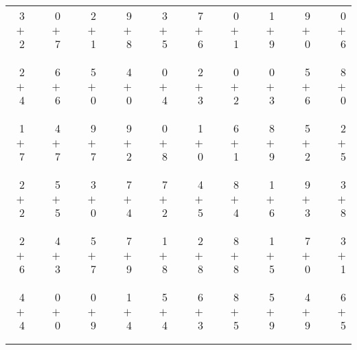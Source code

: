 \documentclass[12pt, letterpaper]{article}
\begin{document}
\begin{tabular}{rrrrrrrrrrrrrrrrrrr}
3 & & 0 & & 2 & & 9 & & 3 & & 7 & & 0 & & 1 & & 9 & & 0\\
$+$ 2 & & $+$ 7 & & $+$ 1 & & $+$ 8 & & $+$ 5 & & $+$ 6 & & $+$ 1 & & $+$ 9 & & $+$ 0 & & $+$ 6\\
\cline{1-1} \cline{3-3} \cline{5-5} \cline{7-7} \cline{9-9} \cline{11-11} \cline{13-13} \cline{15-15} \cline{17-17} \cline{19-19} \\ \\
2 & & 6 & & 5 & & 4 & & 0 & & 2 & & 0 & & 0 & & 5 & & 8\\
$+$ 4 & & $+$ 6 & & $+$ 0 & & $+$ 0 & & $+$ 4 & & $+$ 3 & & $+$ 2 & & $+$ 3 & & $+$ 6 & & $+$ 0\\
\cline{1-1} \cline{3-3} \cline{5-5} \cline{7-7} \cline{9-9} \cline{11-11} \cline{13-13} \cline{15-15} \cline{17-17} \cline{19-19} \\ \\
1 & & 4 & & 9 & & 9 & & 0 & & 1 & & 6 & & 8 & & 5 & & 2\\
$+$ 7 & & $+$ 7 & & $+$ 7 & & $+$ 2 & & $+$ 8 & & $+$ 0 & & $+$ 1 & & $+$ 9 & & $+$ 2 & & $+$ 5\\
\cline{1-1} \cline{3-3} \cline{5-5} \cline{7-7} \cline{9-9} \cline{11-11} \cline{13-13} \cline{15-15} \cline{17-17} \cline{19-19} \\ \\
2 & & 5 & & 3 & & 7 & & 7 & & 4 & & 8 & & 1 & & 9 & & 3\\
$+$ 2 & & $+$ 5 & & $+$ 0 & & $+$ 4 & & $+$ 2 & & $+$ 5 & & $+$ 4 & & $+$ 6 & & $+$ 3 & & $+$ 8\\
\cline{1-1} \cline{3-3} \cline{5-5} \cline{7-7} \cline{9-9} \cline{11-11} \cline{13-13} \cline{15-15} \cline{17-17} \cline{19-19} \\ \\
2 & & 4 & & 5 & & 7 & & 1 & & 2 & & 8 & & 1 & & 7 & & 3\\
$+$ 6 & & $+$ 3 & & $+$ 7 & & $+$ 9 & & $+$ 8 & & $+$ 8 & & $+$ 8 & & $+$ 5 & & $+$ 0 & & $+$ 1\\
\cline{1-1} \cline{3-3} \cline{5-5} \cline{7-7} \cline{9-9} \cline{11-11} \cline{13-13} \cline{15-15} \cline{17-17} \cline{19-19} \\ \\
4 & & 0 & & 0 & & 1 & & 5 & & 6 & & 8 & & 5 & & 4 & & 6\\
$+$ 4 & & $+$ 0 & & $+$ 9 & & $+$ 4 & & $+$ 4 & & $+$ 3 & & $+$ 5 & & $+$ 9 & & $+$ 9 & & $+$ 5\\
\cline{1-1} \cline{3-3} \cline{5-5} \cline{7-7} \cline{9-9} \cline{11-11} \cline{13-13} \cline{15-15} \cline{17-17} \cline{19-19} \\ \\

\end{tabular}
\end{document}
